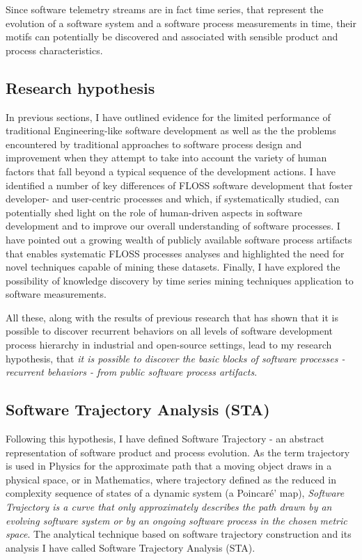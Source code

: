 Since software telemetry streams are in fact time series, that represent the evolution of a software system 
and a software process measurements in time, their motifs can potentially be discovered and associated with 
sensible product and process characteristics.

%
%
\subsection{Research hypothesis}\label{section_research_hypothesis}
In previous sections, I have outlined evidence for the limited performance of traditional Engineering-like 
software development as well as the the problems encountered by traditional approaches to software process 
design and improvement when they attempt to take into account the variety of human factors that fall beyond 
a typical sequence of the development actions.
I have identified a number of key differences of FLOSS software development that foster developer- and user-centric 
processes and which, if systematically studied, can potentially shed light on the role of human-driven aspects in 
software development and to improve our overall understanding of software processes. 
I have pointed out a growing wealth of publicly available software process artifacts that enables systematic FLOSS 
processes analyses and highlighted the need for novel techniques capable of mining these datasets.
Finally, I have explored the possibility of knowledge discovery by time series mining techniques application 
to software measurements.

All these, along with the results of previous research that has shown that it is possible to discover 
recurrent behaviors on all levels of software development process hierarchy \cite{citeulike:8347315} 
in industrial \cite{citeulike:5090131} and open-source \cite{citeulike:10377345} settings, 
lead to my research hypothesis, that \textit{it is possible to discover the basic blocks of software 
processes - recurrent behaviors - from public software process artifacts}. 

\subsection{Software Trajectory Analysis (STA)}
Following this hypothesis, I have defined Software Trajectory - an abstract representation of software
product and process evolution. As the term trajectory is used in Physics for the approximate path that a 
moving object draws in a physical space, or in Mathematics, where trajectory defined as the reduced in 
complexity sequence of states of a dynamic system (a Poincar\'{e}' map), \textit{Software Trajectory is a curve
that only approximately describes the path drawn by an evolving software system or by an ongoing software 
process in the chosen metric space}. The analytical technique based on software trajectory construction
and its analysis I have called Software Trajectory Analysis (STA).

